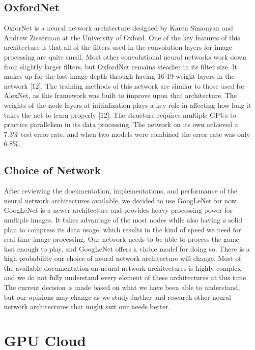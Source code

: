 \documentclass{scrreprt}
\begin{document}
\subsection{OxfordNet}
OxforNet is a neural network architecture designed by Karen Simonyan and Andrew Zisserman at the University of Oxford. 
One of the key features of this architecture is that all of the filters used in the convolution layers for image processing are quite small. 
Most other convolutional neural networks work down from slightly larger filters, but OxfordNet remains steadier in its filter size. 
It makes up for the lost image depth through having 16-19 weight layers in the network [12]. 
The training methods of this network are similar to those used for AlexNet, as this framework was built to improve upon that architecture. 
The weights of the node layers at initialization plays a key role in affecting how long it takes the net to learn properly [12]. 
The structure requires multiple GPUs to practice parallelism in its data processing. 
The network on its own achieved a 7.3\% test error rate, and when two models were combined the error rate was only 6.8\%.


\subsection{Choice of Network}
After reviewing the documentation, implementations, and performance of the neural network architectures available, we decided to use GoogLeNet for now. 
GoogLeNet is a newer architecture and provides heavy processing power for multiple images. 
It takes advantage of the most nodes while also having a solid plan to compress its data usage, which results in the kind of speed we need for real-time image processing. 
Our network needs to be able to process the game fast enough to play, and GoogLeNet offers a viable model for doing so.
There is a high probability our choice of neural network architecture will change. 
Most of the available documentation on neural network architectures is highly complex and we do not fully understand every element of these architectures at this time. 
The current decision is made based on what we have been able to understand, but our opinions may change as we study further and research other neural network architectures that might suit our needs better.

\section{GPU Cloud}
\end{document}
